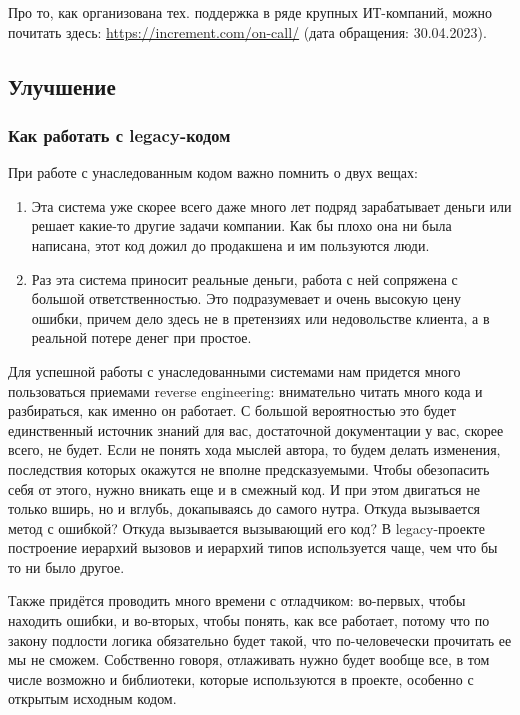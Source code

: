 \documentclass{../../text-style}
\begin{document}
Про то, как организована тех. поддержка в ряде крупных ИТ-компаний, можно почитать здесь: \url{https://increment.com/on-call/} (дата обращения: 30.04.2023).

\subsection{Улучшение}

\subsubsection{Как работать с legacy-кодом}

При работе с унаследованным кодом важно помнить о двух вещах:

\begin{enumerate}
    \item Эта система уже скорее всего даже много лет подряд зарабатывает деньги или решает какие-то другие задачи компании. Как бы плохо она ни была написана, этот код дожил до продакшена и им пользуются люди.
    \item Раз эта система приносит реальные деньги, работа с ней сопряжена с большой ответственностью. Это подразумевает и очень высокую цену ошибки, причем дело здесь не в претензиях или недовольстве клиента, а в реальной потере денег при простое.
\end{enumerate}

Для успешной работы с унаследованными системами нам придется много пользоваться приемами reverse engineering: внимательно читать много кода и разбираться, как именно он работает. С большой вероятностью это будет единственный источник знаний для вас, достаточной документации у вас, скорее всего, не будет. Если не понять хода мыслей автора, то будем делать изменения, последствия которых окажутся не вполне предсказуемыми. Чтобы обезопасить себя от этого, нужно вникать еще и в смежный код. И при этом двигаться не только вширь, но и вглубь, докапываясь до самого нутра. Откуда вызывается метод с ошибкой? Откуда вызывается вызывающий его код? В legacy-проекте построение иерархий вызовов и иерархий типов используется чаще, чем что бы то ни было другое.

Также придётся проводить много времени с отладчиком: во-первых, чтобы находить ошибки, и во-вторых, чтобы понять, как все работает, потому что по закону подлости логика обязательно будет такой, что по-человечески прочитать ее мы не сможем. Собственно говоря, отлаживать нужно будет вообще все, в том числе возможно и библиотеки, которые используются в проекте, особенно с открытым исходным кодом.
\end{document}
